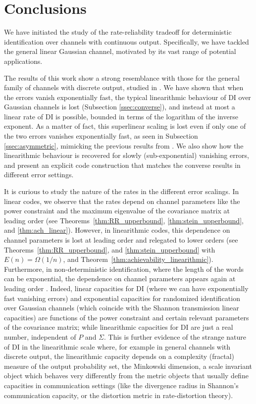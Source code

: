 \documentclass[10pt,conference]{IEEEtran}
\newcommand{\1}{\mathds{1}}
\begin{document}
\medskip
\section{Conclusions}
We have initiated the study of the rate-reliability tradeoff for deterministic identification over channels with continuous output. Specifically, we have tackled the general linear Gaussian channel, motivated by its vast range of potential applications. 

The results of this work show a strong resemblance with those for the general family of channels with discrete output, studied in \cite{CDBW:Reliability-TCOM}. We have shown that when the errors vanish exponentially fast, the typical linearithmic behaviour of DI over Gaussian channels is lost (Subsection \ref{ssec:converse}), and instead at most a linear rate of DI is possible, bounded in terms of the logarithm of the inverse exponent. As a matter of fact, this superlinear scaling is lost even if only one of the two errors vanishes exponentially fast, as seen in Subsection \ref{ssec:asymmetric}, mimicking the previous results from \cite{CDBW:Reliability-TCOM}. We also show how the linearithmic behaviour is recovered for slowly (sub-exponential) vanishing errors, and present an explicit code construction that matches the converse results in different error settings.

It is curious to study the nature of the rates in the different error scalings. In linear codes, we observe that the rates depend on channel parameters like the power constraint and the maximum eigenvalue of the covariance matrix at leading order (see Theorems~\ref{thm:RR_upperbound}, \ref{thm:stein_upperbound}, and \ref{thm:ach_linear}). However, in linearithmic codes, this dependence on channel parameters is lost at leading order and relegated to lower orders (see Theorems~\ref{thm:RR_upperbound}, and \ref{thm:stein_upperbound} with $E(n)=\Omega(1/n)$, and Theorem~\ref{thm:achievability_linearithmic}). Furthermore, in non-deterministic identification, where the length of the words can be exponential, the dependence on channel parameters appears again at leading order \cite{DI-fading,LDB:secure_ID_Gaussian}. Indeed, linear capacities for DI (where we can have exponentially fast vanishing errors) and exponential capacities for randomized identification over Gaussian channels (which coincide with the Shannon transmission linear capacities) are functions of the power constraint and certain relevant parameters of the covariance matrix; while linearithmic capacities for DI are just a real number, independent of $P$ and $\Sigma$. 
This is further evidence of the strange nature of DI in the linearithmic scale where, for example in general channels with discrete output, the linearithmic capacity depends on a complexity (fractal) measure of the output probability set, the Minkowski dimension, a scale invariant object which behaves very differently from the metric objects that usually define capacities in communication settings (like the divergence radius in Shannon's communication capacity, or the distortion metric in rate-distortion theory).
\end{document}
